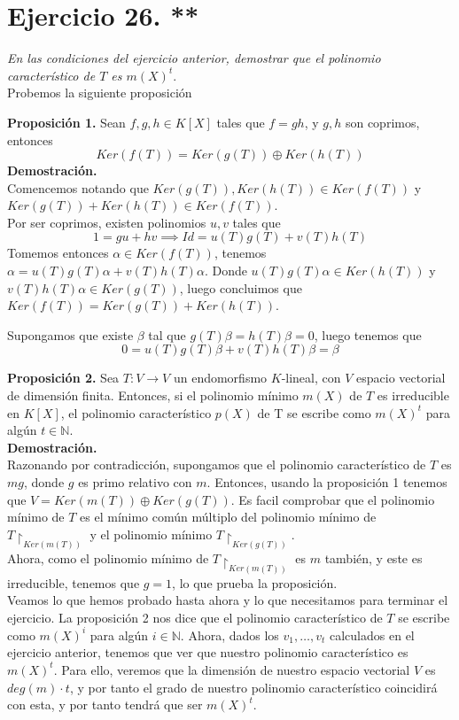\section{Ejercicio 26. **} \textit{En las condiciones del ejercicio anterior,
  demostrar que el polinomio característico de \(T\) es \(m(X)^t\)}.\\

Probemos la siguiente proposición

\textbf{Proposición 1. }Sean \(f,g,h \in K[X]\) tales que \(f = gh\), y \(g,h\) son
coprimos, entonces
\[
  Ker(f(T)) = Ker(g(T)) \oplus Ker(h(T))
\]
\textbf{Demostración.}\\
Comencemos notando que \(Ker(g(T)), Ker(h(T)) \in Ker(f(T))\) y \(Ker(g(T)) +
Ker(h(T)) \in Ker(f(T))\).\\ Por ser coprimos, existen polinomios \(u,v\) tales
que
\[
  1 = gu + hv \implies Id = u(T)g(T) + v(T)h(T)
\]
Tomemos entonces \(\alpha \in Ker(f(T))\), tenemos \(\alpha = u(T)g(T)\alpha +
v(T)h(T)\alpha\).
Donde  \( u(T)g(T)\alpha \in Ker(h(T))\) y  \( v(T)h(T)\alpha \in Ker(g(T))\),
luego concluimos que \(Ker(f(T)) = Ker(g(T)) + Ker(h(T))\).

Supongamos que existe \(\beta\) tal que \(g(T)\beta = h(T)\beta = 0\), luego
tenemos que
\[
  0 = u(T)g(T)\beta + v(T)h(T)\beta = \beta
\]

\textbf{Proposición 2.} Sea \(T: V \rightarrow V \) un endomorfismo \(K\)-lineal, con \(V\) espacio vectorial de dimensión finita. Entonces, si el polinomio mínimo \(m(X)\) de  \(T\) es irreducible en  \(K[X]\), el polinomio característico \(p(X)\) de T se escribe como \(m(X)^t\) para algún \(t \in \mathbb{N}\).\\

\textbf{Demostración.}\\
Razonando por contradicción, supongamos que el polinomio característico de \(T\) es  \(mg\), donde  \(g\) es primo relativo con \(m\). Entonces, usando la proposición 1 tenemos que \(V = Ker(m(T)) \oplus Ker(g(T))\). Es facil comprobar que el polinomio mínimo de \(T\) es el mínimo común múltiplo del polinomio mínimo de \(T\restriction_{Ker(m(T))}\) y el polinomio mínimo \(T\restriction_{Ker(g(T))}\).\\

Ahora, como el polinomio mínimo de \(T\restriction_{Ker(m(T))}\) es \(m\) también, y este es irreducible, tenemos que \(g = 1\), lo que prueba la proposición.\\

Veamos lo que hemos probado hasta ahora y lo que necesitamos para terminar el ejercicio. La proposición 2 nos dice que el polinomio característico de \(T\) se escribe como \(m(X)^i\) para algún \(i \in \mathbb{N}\). Ahora, dados los \(v_1, \dots, v_t\) calculados en el ejercicio anterior, tenemos que ver que nuestro polinomio característico es \(m(X)^t\). Para ello, veremos que la dimensión de nuestro espacio vectorial \(V\) es  \(deg(m) \cdot t\), y por tanto el grado de nuestro polinomio característico coincidirá con esta, y por tanto tendrá que ser \(m(X)^t\).\\

